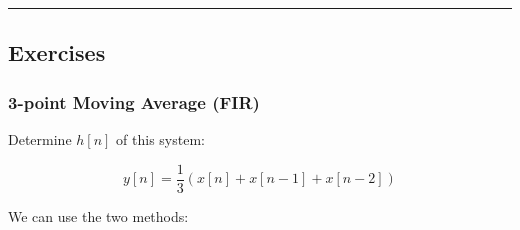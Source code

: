 \begin{center}\rule{0.5\linewidth}{0.5pt}\end{center}

\hypertarget{exercises}{%
\subsection{Exercises}\label{exercises}}

\hypertarget{point-moving-average-fir}{%
\subsubsection{3-point Moving Average
(FIR)}\label{point-moving-average-fir}}

Determine \(h[n]\) of this system:

\[
y[n] = \frac{1}{3}(x[n] + x[n-1] + x[n-2])
\]

We can use the two methods:

